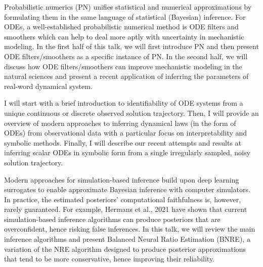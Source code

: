 \documentclass[a4paper,UKenglish]{dagrep-v2018}
\begin{document}
Probabilistic numerics (PN) unifies statistical and numerical approximations by formulating them in the same language of statistical (Bayesian) inference. For ODEs, a well-established probabilistic numerical method is ODE filters and smoothers which can help to deal more aptly with uncertainty in mechanistic modeling. In the first half of this talk, we will first introduce PN and then present ODE filters/smoothers as a specific instance of PN. In the second half, we will discuss how ODE filters/smoothers can improve mechanistic modeling in the natural sciences and present a recent application of inferring the parameters of real-word dynamical system.

\license

I will start with a brief introduction to identifiability of ODE systems from a unique continuous or discrete observed solution trajectory. Then, I will provide an overview of modern approaches to inferring dynamical laws (in the form of ODEs) from observational data with a particular focus on interpretability and symbolic methods. Finally, I will describe our recent attempts and results at inferring scalar ODEs in symbolic form from a single irregularly sampled, noisy solution trajectory.

\license

Modern approaches for simulation-based inference build upon deep learning surrogates to enable approximate Bayesian inference with computer simulators. In practice, the estimated posteriors' computational faithfulness is, however, rarely guaranteed. For example, Hermans et al., 2021 have shown that current simulation-based inference algorithms can produce posteriors that are overconfident, hence risking false inferences. In this talk, we will review the main inference algorithms and present Balanced Neural Ratio Estimation (BNRE), a variation of the NRE algorithm designed to produce posterior approximations that tend to be more conservative, hence improving their reliability.

\license
\end{document}
